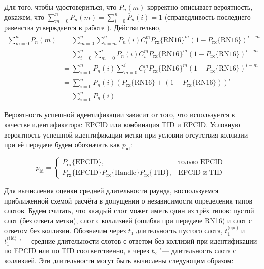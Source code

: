 Для того, чтобы удостовериться, что $P_n(m)$ корректно описывает вероятность, докажем, что $\sum\limits_{m = 0}^n P_n(m) = \sum\limits_{i=0}^n \overline{P}_n(i) = 1$ (справедливость последнего равенства утверждается в работе \cite{Vales-Alonso2011}). Действительно,
$$
\begin{aligned}
	\sum\limits_{m=0}^n P_n(m) &=
		\sum\limits_{m=0}^n \sum\limits_{i=m}^n \overline{P}_n(i) C_i^m
			P_\text{rx}\{\text{RN16}\}^m (1 - P_\text{rx}\{\text{RN16}\})^{i-m}\\
	&= \sum\limits_{i=0}^n \sum\limits_{m=0}^i \overline{P}_n(i) C_i^m
			P_\text{rx}\{\text{RN16}\}^m (1 - P_\text{rx}\{\text{RN16}\})^{i-m}\\
	&= \sum\limits_{i=0}^n \overline{P}_n(i) \sum\limits_{m=0}^i C_i^m
			P_\text{rx}\{\text{RN16}\}^m (1 - P_\text{rx}\{\text{RN16}\})^{i-m}\\
	&= \sum\limits_{i=0}^n \overline{P}_n(i) \left( P_\text{rx}\{\text{RN16}\} + (1 - P_\text{rx}\{\text{RN16}\}) \right)^i\\
	&= \sum\limits_{i=0}^n \overline{P}_n(i)
\end{aligned}
$$

Вероятность успешной идентификации зависит от того, что используется в качестве идентификатора: EPCID или комбинация TID и EPCID. Условную вероятность успешной идентификации метки при условии отсутствия коллизии при её передаче будем обозначать как $p_{\text{id}}$:

\begin{equation}\label{eq:ch3_p_id}
	p_{\text{id}} = \begin{cases}
		P_{\text{rx}}\{\text{EPCID}\}, &\text{только EPCID}\\
		P_{\text{rx}}\{\text{EPCID}\}P_{\text{rx}}\{\text{Handle}\}P_{\text{rx}}\{\text{TID}\},&\text{EPCID и TID}
	\end{cases}
\end{equation}

Для вычисления оценки средней длительности раунда, воспользуемся приближенной схемой расчёта в допущении о независимости определения типов слотов. Будем считать, что каждый слот может иметь один из трёх типов: пустой слот (без ответа метки), слот с коллизией (ошибка при передаче RN16) и слот с ответом без коллизии. Обозначим через $t_0$ длительность пустого слота, $t_1^{\text{(epc)}}$ и $t_1^{\text{(tid)}}$  "--- средние длительности слотов с ответом без коллизий при идентификации по EPCID или по TID соответственно, а через $t_2$ "--- длительность слота с коллизией. Эти длительности могут быть вычислены следующим образом:

